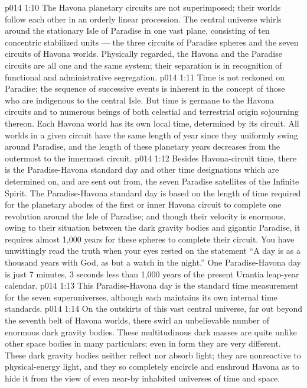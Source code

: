 \vs p014 1:10 The Havona planetary circuits are not superimposed; their worlds follow each other in an orderly linear procession. The central universe whirls around the stationary Isle of Paradise in one vast plane, consisting of ten concentric stabilized units --- the three circuits of Paradise spheres and the seven circuits of Havona worlds. Physically regarded, the Havona and the Paradise circuits are all one and the same system; their separation is in recognition of functional and administrative segregation.
\vs p014 1:11 \pc Time is not reckoned on Paradise; the sequence of successive events is inherent in the concept of those who are indigenous to the central Isle. But time is germane to the Havona circuits and to numerous beings of both celestial and terrestrial origin sojourning thereon. Each Havona world has its own local time, determined by its circuit. All worlds in a given circuit have the same length of year since they uniformly swing around Paradise, and the length of these planetary years decreases from the outermost to the innermost circuit.
\vs p014 1:12 Besides Havona\hyp{}circuit time, there is the Paradise\hyp{}Havona standard day and other time designations which are determined on, and are sent out from, the seven Paradise satellites of the Infinite Spirit. The Paradise\hyp{}Havona standard day is based on the length of time required for the planetary abodes of the first or inner Havona circuit to complete one revolution around the Isle of Paradise; and though their velocity is enormous, owing to their situation between the dark gravity bodies and gigantic Paradise, it requires almost 1,000 years for these spheres to complete their circuit. You have unwittingly read the truth when your eyes rested on the statement “A day is as a thousand years with God, as but a watch in the night.” One Paradise\hyp{}Havona day is just 7 minutes, 3 seconds less than 1,000 years of the present Urantia leap\hyp{}year calendar.
\vs p014 1:13 This Paradise\hyp{}Havona day is the standard time measurement for the seven superuniverses, although each maintains its own internal time standards.
\vs p014 1:14 \pc On the outskirts of this vast central universe, far out beyond the seventh belt of Havona worlds, there swirl an unbelievable number of enormous dark gravity bodies. These multitudinous dark masses are quite unlike other space bodies in many particulars; even in form they are very different. These dark gravity bodies neither reflect nor absorb light; they are nonreactive to physical\hyp{}energy light, and they so completely encircle and enshroud Havona as to hide it from the view of even near\hyp{}by inhabited universes of time and space.
